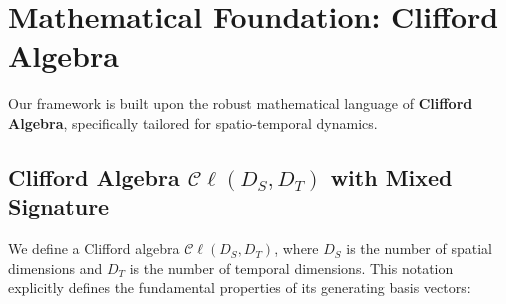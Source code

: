 \documentclass[11pt]{article}
\begin{document}
\section{Mathematical Foundation: Clifford Algebra}

Our framework is built upon the robust mathematical language of \textbf{Clifford Algebra}, specifically tailored for spatio-temporal dynamics.

\subsection{Clifford Algebra $\mathcal{C}\ell(D_S, D_T)$ with Mixed Signature}

We define a Clifford algebra $\mathcal{C}\ell(D_S, D_T)$, where $D_S$ is the number of spatial dimensions and $D_T$ is the number of temporal dimensions. This notation explicitly defines the fundamental properties of its generating basis vectors:
\end{document}
